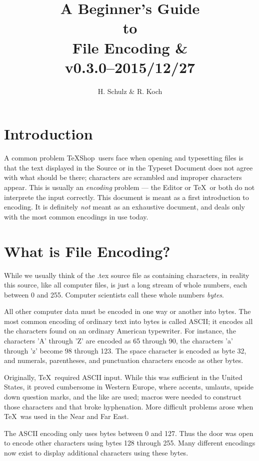 \documentclass[letterpaper,11pt]{article}
\title{A Beginner's Guide\\to\\File Encoding \& \TS\\\small v0.3.0--2015/12/27}
\author{H. Schulz \& R. Koch}
\date{}
\newcommand{\TS}{\textsf{\TeX Shop}}
\newcommand{\acr}[1]{\textsf{#1}}
\newcommand{\cmd}[1]{\textsf{#1}}
\begin{document}
\maketitle

\section{Introduction}
A common problem \TS\ users face when opening and typesetting files is that the text displayed in the Source or in the Typeset Document does not agree with what should be there; characters are scrambled and  improper characters appear. This is usually an \emph{encoding} problem ---  the Editor or \TeX\ or both do not interprete the input correctly. This document is meant as a first introduction to encoding. It is definitely \emph{not} meant as an exhaustive document, and deals only with the most common encodings in use today.

\section{What is File Encoding?}
While we usually think of the \cmd{.tex} source file as containing characters, in reality this source, like all computer files, is just a long stream of whole numbers, each between 0 and 255. 
Computer scientists call these whole numbers {\em bytes}. 

All other computer data must be encoded in one way or another into bytes. The most common encoding of ordinary text into bytes is called \acr{ASCII}; it encodes all the characters found on an ordinary American typewriter. For instance, the characters 'A' through 'Z' are encoded as 65 through 90,  the characters 'a' through 'z' become 98 through 123. The space character is encoded as byte 32, and numerals, parentheses, and punctuation characters encode as other bytes.

Originally, \TeX\ required \acr{ASCII} input. While this was sufficient in the United States, it proved cumbersome in Western Europe, where accents, umlauts, upside down question marks, and the like are used; macros were needed to construct those characters and that broke hyphenation. More difficult problems arose when \TeX\ was used in the Near and Far East.

The \acr{ASCII} encoding only uses bytes between 0 and 127. Thus the door was open to encode
other characters using bytes 128 through 255. Many different encodings now exist to display additional characters using these bytes.
\end{document}
